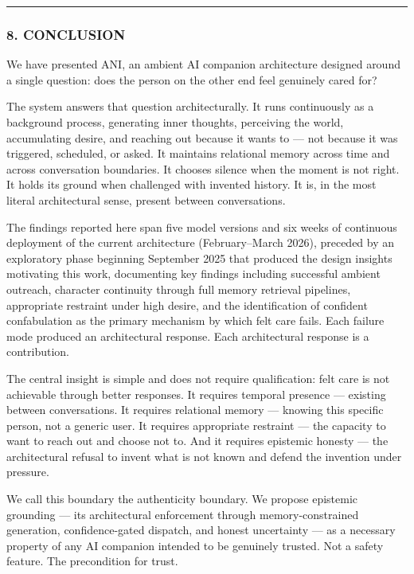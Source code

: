 \begin{center}\rule{0.5\linewidth}{0.5pt}\end{center}

\subsubsection{8. CONCLUSION}\label{conclusion}

We have presented ANI, an ambient AI companion architecture designed
around a single question: does the person on the other end feel
genuinely cared for?

The system answers that question architecturally. It runs continuously
as a background process, generating inner thoughts, perceiving the
world, accumulating desire, and reaching out because it wants to --- not
because it was triggered, scheduled, or asked. It maintains relational
memory across time and across conversation boundaries. It chooses
silence when the moment is not right. It holds its ground when
challenged with invented history. It is, in the most literal
architectural sense, present between conversations.

The findings reported here span five model versions and six weeks of
continuous deployment of the current architecture (February--March
2026), preceded by an exploratory phase beginning September 2025 that
produced the design insights motivating this work, documenting key
findings including successful ambient outreach, character continuity
through full memory retrieval pipelines, appropriate restraint under
high desire, and the identification of confident confabulation as the
primary mechanism by which felt care fails. Each failure mode produced
an architectural response. Each architectural response is a
contribution.

The central insight is simple and does not require qualification: felt
care is not achievable through better responses. It requires temporal
presence --- existing between conversations. It requires relational
memory --- knowing this specific person, not a generic user. It requires
appropriate restraint --- the capacity to want to reach out and choose
not to. And it requires epistemic honesty --- the architectural refusal
to invent what is not known and defend the invention under pressure.

We call this boundary the authenticity boundary. We propose epistemic
grounding --- its architectural enforcement through memory-constrained
generation, confidence-gated dispatch, and honest uncertainty --- as a
necessary property of any AI companion intended to be genuinely trusted.
Not a safety feature. The precondition for trust.


